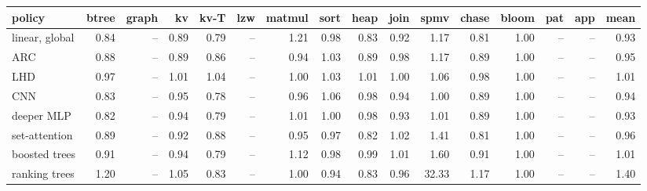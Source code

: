 \begin{tabular}{lrrrrrrrrrrrrrrr}
\toprule
policy & btree & graph & kv & kv-T & lzw & matmul & sort & heap & join & spmv & chase & bloom & pat & app & mean \\
\midrule
linear, global & 0.84 & -- & 0.89 & 0.79 & -- & 1.21 & 0.98 & 0.83 & 0.92 & 1.17 & 0.81 & 1.00 & -- & -- & 0.93 \\
ARC & 0.88 & -- & 0.89 & 0.86 & -- & 0.94 & 1.03 & 0.89 & 0.98 & 1.17 & 0.89 & 1.00 & -- & -- & 0.95 \\
LHD & 0.97 & -- & 1.01 & 1.04 & -- & 1.00 & 1.03 & 1.01 & 1.00 & 1.06 & 0.98 & 1.00 & -- & -- & 1.01 \\
CNN & 0.83 & -- & 0.95 & 0.78 & -- & 0.96 & 1.06 & 0.98 & 0.94 & 1.00 & 0.89 & 1.00 & -- & -- & 0.94 \\
deeper MLP & 0.82 & -- & 0.94 & 0.79 & -- & 1.01 & 1.00 & 0.98 & 0.93 & 1.01 & 0.89 & 1.00 & -- & -- & 0.93 \\
set-attention & 0.89 & -- & 0.92 & 0.88 & -- & 0.95 & 0.97 & 0.82 & 1.02 & 1.41 & 0.81 & 1.00 & -- & -- & 0.96 \\
boosted trees & 0.91 & -- & 0.94 & 0.79 & -- & 1.12 & 0.98 & 0.99 & 1.01 & 1.60 & 0.91 & 1.00 & -- & -- & 1.01 \\
ranking trees & 1.20 & -- & 1.05 & 0.83 & -- & 1.00 & 0.94 & 0.83 & 0.96 & 32.33 & 1.17 & 1.00 & -- & -- & 1.40 \\
\bottomrule
\end{tabular}
